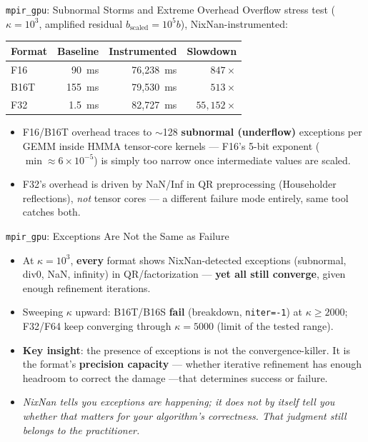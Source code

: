 \documentclass[aspectratio=169,11pt]{beamer}
\begin{document}
\begin{frame}{\texttt{mpir\_gpu}: Subnormal Storms and Extreme Overhead}
Overflow stress test ($\kappa=10^3$, amplified residual $b_{\text{scaled}}=10^5b$),
NixNan-instrumented:
\begin{center}
\scriptsize
\begin{tabular}{lrrr}
\toprule
Format & Baseline & Instrumented & Slowdown \\
\midrule
F16 & 90~ms & 76{,}238~ms & $847\times$ \\
B16T & 155~ms & 79{,}530~ms & $513\times$ \\
F32 & 1.5~ms & 82{,}727~ms & $55{,}152\times$ \\
\bottomrule
\end{tabular}
\end{center}
\begin{itemize}
  \item F16/B16T overhead traces to $\sim$128 \textbf{subnormal (underflow)}
    exceptions per GEMM inside HMMA tensor-core kernels --- F16's 5-bit
    exponent ($\min\approx6{\times}10^{-5}$) is simply too narrow once
    intermediate values are scaled.
  \item F32's overhead is driven by NaN/Inf in QR preprocessing (Householder
    reflections), \emph{not} tensor cores --- a different failure mode
    entirely, same tool catches both.
\end{itemize}
\end{frame}

\begin{frame}{\texttt{mpir\_gpu}: Exceptions Are Not the Same as Failure}
\begin{itemize}
  \item At $\kappa=10^3$, \textbf{every} format shows NixNan-detected
    exceptions (subnormal, div0, NaN, infinity) in QR/factorization ---
    \textbf{yet all still converge}, given enough refinement iterations.
  \item Sweeping $\kappa$ upward: B16T/B16S \textbf{fail} (breakdown,
    \texttt{niter=-1}) at $\kappa\geq2000$; F32/F64 keep converging through
    $\kappa=5000$ (limit of the tested range).
  \item \textbf{Key insight}: the presence of exceptions is not the
    convergence-killer. It is the format's \textbf{precision capacity} ---
    whether iterative refinement has enough headroom to correct the damage
    ---that determines success or failure.
  \item \textit{NixNan tells you exceptions are happening; it does not by
    itself tell you whether that matters for your algorithm's correctness.
    That judgment still belongs to the practitioner.}
\end{itemize}
\end{frame}
\end{document}
